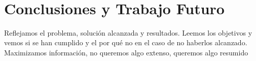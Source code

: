\newpage
~
\newpage
\section{Conclusiones y Trabajo Futuro}
Reflejamos el problema, solución alcanzada y resultados.
Leemos los objetivos y vemos si se han cumplido y el por qué no en el caso de no haberlos alcanzado. 
Maximizamos información, no queremos algo extenso, queremos algo resumido
